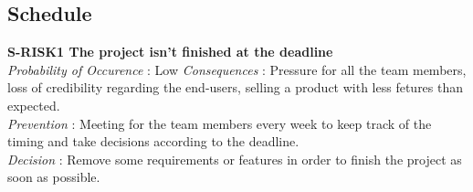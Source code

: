 \subsection{Schedule}
	\textbf{ S-RISK1 The project isn't finished at the deadline} \\
	\textit {Probability of Occurence}  : Low
	\textit{Consequences} : Pressure for all the team members, loss of credibility regarding the end-users, selling a product with less fetures than expected.\\
	\textit{Prevention} : Meeting for the team members every week to keep track of the timing and take decisions according to the deadline. \\
	\textit{Decision} : Remove some requirements or features in order to finish the project as soon as possible.\\
